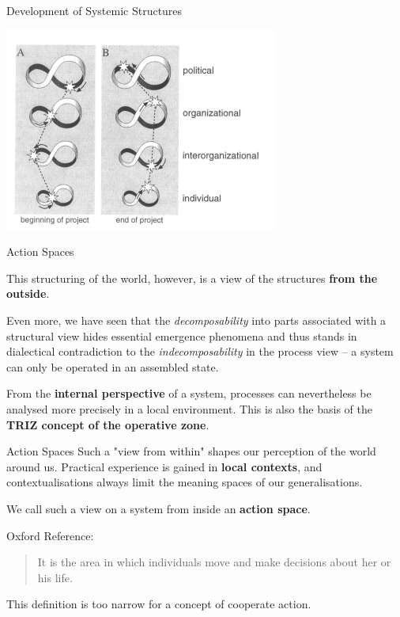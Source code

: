 \documentclass{beamer}
\begin{document}
\begin{frame}{Development of Systemic Structures}
  \begin{center}
    \includegraphics[width=.85\textwidth]{Bilder/Holling-5.png}
  \end{center}
\end{frame}

\begin{frame}{Action Spaces}

This structuring of the world, however, is a view of the structures
\textbf{from the outside}.

Even more, we have seen that the \emph{decomposability} into parts associated
with a structural view hides essential emergence phenomena and thus stands in
dialectical contradiction to the \emph{indecomposability} in the process view
-- a system can only be operated in an assembled state.

From the \textbf{internal perspective} of a system, processes can nevertheless
be analysed more precisely in a local environment. This is also the basis of
the \textbf{TRIZ concept of the operative zone}.

\end{frame}

\begin{frame}{Action Spaces}
Such a "view from within" shapes our perception of the world around us.
Practical experience is gained in \textbf{local contexts}, and
contextualisations always limit the meaning spaces of our generalisations.

\begin{block}{}
  We call such a view on a system from inside an \textbf{action space}.
\end{block}

Oxford Reference:
\begin{quote}
  It is the area in which individuals move and make decisions about her or
  his life.
\end{quote}

This definition is too narrow for a concept of cooperate action. 

\end{frame}
\end{document}
